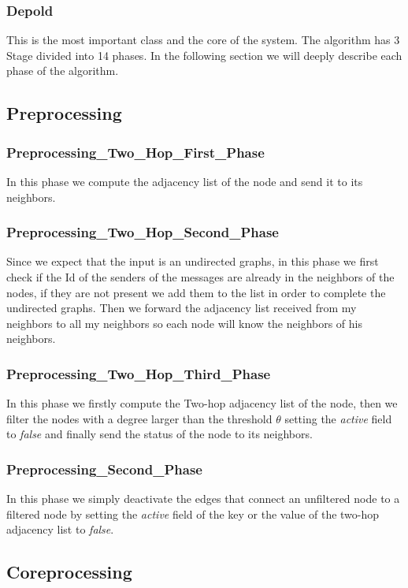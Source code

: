 \documentclass[12pt]{article}
\begin{document}
\subsubsection{Depold}
This is the most important class and the core of the system. The algorithm has 3 Stage divided into 14 phases. In the following section we will deeply describe each phase of the algorithm.
\subsection{Preprocessing}
\subsubsection{Preprocessing\_Two\_Hop\_First\_Phase}
In this phase we compute the adjacency list of the node and send it to its neighbors.
\subsubsection{Preprocessing\_Two\_Hop\_Second\_Phase}
Since we expect that the input is an undirected graphs, in this phase we first check if the Id of the senders of the messages are already in the neighbors of the nodes, if they are not present we add them to the list in order to complete the undirected graphs.
Then we forward the adjacency list received from my neighbors to all my neighbors so each node will know the neighbors of his neighbors.
\subsubsection{Preprocessing\_Two\_Hop\_Third\_Phase}
In this phase we firstly compute the Two-hop adjacency list of the node, then we filter the nodes with a degree larger than the threshold $\theta$ setting the \emph{active} field to \emph{false} and finally send the status of the node to its neighbors.
\subsubsection{Preprocessing\_Second\_Phase}
In this phase we simply deactivate the edges that connect an unfiltered node to a filtered node by setting the \emph{active} field of the key or the value of the two-hop adjacency list to \emph{false}.
\subsection{Coreprocessing}
\end{document}
